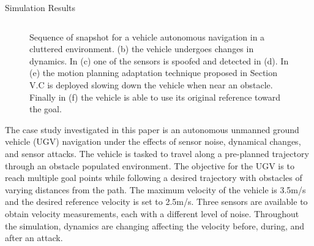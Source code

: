 \begin{section}{Simulation Results}
\begin{figure}[t]
\begin{tabular}{ccc}
\end{tabular}
\vspace{-8pt}
\caption{ Sequence of snapshot for a vehicle autonomous navigation in a cluttered environment. (b) the vehicle undergoes changes in dynamics. In (c) one of the sensors is spoofed and detected in (d). In (e) the motion planning adaptation technique proposed in Section V.C is deployed slowing down the vehicle when near an obstacle. Finally in (f) the vehicle is able to use its original reference toward the goal.} 
\vspace{-8pt}
\end{figure}

The case study investigated in this paper is an autonomous unmanned ground vehicle (UGV) navigation under the effects of sensor noise, dynamical changes, and sensor attacks. The vehicle is tasked to travel along a pre-planned trajectory through an obstacle populated environment. 
The objective for the UGV is to reach multiple goal points while following a desired trajectory with obstacles of varying distances from the path. The maximum velocity of the vehicle is 3.5m/s and the desired reference velocity is set to 2.5m/s. Three sensors are available to obtain velocity measurements, each with a different level of noise. Throughout the simulation, dynamics are changing affecting the velocity before, during, and after an attack. 


\end{section}
